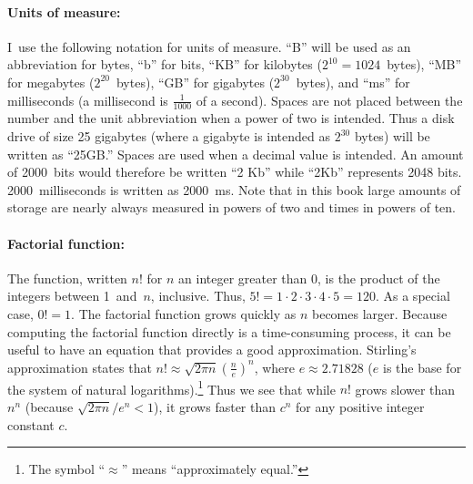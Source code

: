 \paragraph{Units of measure:}
I~use the following
notation for units of measure.
``B'' will be used as an abbreviation for bytes, ``b'' for bits,
``KB'' for kilobytes (\(2^{10} = 1024\)~bytes),
``MB'' for megabytes (\(2^{20}\)~bytes),
``GB'' for gigabytes (\(2^{30}\)~bytes),
and ``ms'' for milliseconds
(a millisecond is \(\frac{1}{1000}\) of a second).
Spaces are not placed between the number and the unit abbreviation
when a power of two is intended.
Thus a disk drive of size 25 gigabytes (where a gigabyte is intended
as \(2^{30}\) bytes) will be written as ``25GB.''
Spaces are used when a decimal value is intended.
An amount of 2000~bits would therefore be written ``2 Kb'' while
``2Kb'' represents 2048 bits.
2000~milliseconds is written as 2000~ms.
Note that in this book large amounts of storage are nearly always
measured in powers of two and times in powers of
ten.

\paragraph{Factorial function:}
The  function,
written \(n!\) for \(n\) an integer greater than 0, is the product of
the integers between 1~and~\(n\), inclusive.
Thus, \(5! = 1 \cdot 2 \cdot 3 \cdot 4 \cdot 5 = 120\).
As a special case, \(0! = 1\).
The factorial function grows quickly as \(n\) becomes larger.
Because computing the factorial function directly is a time-consuming
process, it can be useful to have an equation that provides a
good approximation.
Stirling's approximation
states that \(n! \approx \sqrt{2\pi n}(\frac{n}{e})^n\),
where \(e \approx 2.71828\)
(\(e\) is the base for the system of natural logarithms).\footnote{
The symbol ``\(\approx\)'' means ``approximately equal.''}
Thus we see that while \(n!\) grows
slower than \(n^n\) (because \(\sqrt{2\pi n}/e^n < 1\)),
it grows faster than \(c^n\) for any positive integer constant \(c\).


